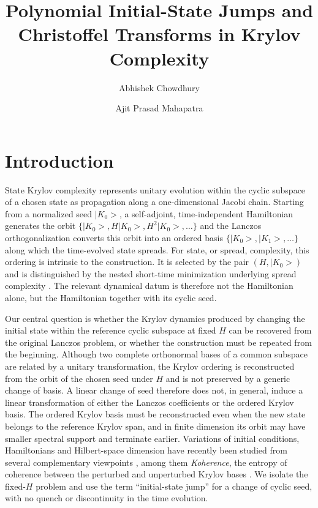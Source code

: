 \documentclass[a4paper,11pt]{article}
\title{Polynomial
Initial-State Jumps and Christoffel Transforms in Krylov Complexity}
\author[a\orcidlink{0000-0003-0948-4817}]{Abhishek Chowdhury}
\author[a\orcidlink{0009-0002-0199-9066}]{Ajit Prasad Mahapatra}
\affiliation[a]{School of Basic Sciences, Indian Institute of Technology Bhubaneswar, Argul, Odisha 752050, India}
\def\ket#1{|#1>}%
\theoremstyle{definition}
\theoremstyle{remark}
\newcommand{\ket}[1]{|#1\rangle}
\begin{document}
\hypersetup{pageanchor=false}
\maketitle
\hypersetup{pageanchor=true}

\section{Introduction}
\label{sec:intro}

State Krylov complexity represents unitary evolution within the cyclic subspace of a chosen state as propagation along a one-dimensional Jacobi chain. Starting from a normalized seed $\ket{K_0}$, a self-adjoint, time-independent Hamiltonian generates the orbit 
$\{\ket{K_0},H\ket{K_0},H^2\ket{K_0},\ldots\}$ and the Lanczos orthogonalization converts this orbit into an ordered basis
$\{\ket{K_0},\ket{K_1},\ldots\}$ along which the time-evolved state spreads. For state, or spread, complexity, this ordering is intrinsic to the construction. It is selected by the pair $(H,\ket{K_0})$ and is distinguished by the nested short-time minimization underlying spread complexity \cite{Balasubramanian:2022tpr}. The relevant dynamical datum is therefore not the Hamiltonian alone, but the Hamiltonian together with its cyclic seed.

Our central question is whether the Krylov dynamics produced by changing the initial state within the reference cyclic subspace at fixed $H$ can be recovered from the original Lanczos problem, or whether the construction must be repeated from the beginning. Although two complete orthonormal bases of a common subspace are related by a unitary transformation, the Krylov ordering is reconstructed from the orbit of the chosen seed under $H$ and is not preserved by a generic change of basis. A linear change of seed therefore does not, in general, induce a linear transformation of either the Lanczos coefficients or the ordered Krylov basis. The ordered Krylov basis must be reconstructed even when the new state belongs to the reference Krylov span, and in finite dimension its orbit may have smaller spectral support and terminate earlier. Variations of initial conditions, Hamiltonians and Hilbert-space dimension have recently been studied from several complementary viewpoints \cite{KunduMalvimatSinha2023,SreeramKannanModakAravinda2025,Balasubramanian:2025variations}, among them \emph{Koherence}, the entropy of coherence between the perturbed and unperturbed Krylov bases \cite{Balasubramanian:2025variations}. We isolate the fixed-$H$ problem and use the term ``initial-state jump'' for a change of cyclic seed, with no quench or discontinuity in the time evolution.
\end{document}

